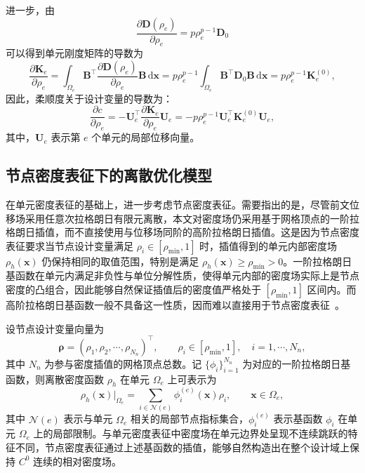 进一步，由
\[
\frac{\partial \boldsymbol D(\rho_e)}{\partial \rho_e} = p\rho_e^{p-1}\boldsymbol D_0
\]
可以得到单元刚度矩阵的导数为
\[
\frac{\partial\boldsymbol{K}_e}{\partial\rho_e} = \int_{\Omega_e}\boldsymbol{B}^{\top}\frac{\partial\boldsymbol{D}(\rho_e)}{\partial\rho_e}\boldsymbol{B}\,\mathrm{d}\boldsymbol{x} = p\rho_e^{p-1}\int_{\Omega_e}\boldsymbol{B}^{\top}\boldsymbol{D}_0\boldsymbol{B}\,\mathrm{d}\boldsymbol{x} = p\rho_e^{p-1}\boldsymbol{K}_e^{(0)},
\]
因此，柔顺度关于设计变量的导数为：
\begin{equation} \label{eq:ch3_sens_cell_compliance}
	\frac{\partial{c}}{\partial\rho_e} = -\boldsymbol{U}_e^{\top}\frac{\partial\boldsymbol{K}_e}{\partial\rho_e}\boldsymbol{U}_e = -p\rho_e^{p-1}\boldsymbol{U}_e^{\top}\boldsymbol{K}_e^{(0)}\boldsymbol{U}_e,
\end{equation}
其中，$\boldsymbol{U}_e$ 表示第 $e$ 个单元的局部位移向量。


\subsection{节点密度表征下的离散优化模型}
\label{subsec:node_density_rep}

在单元密度表征的基础上，进一步考虑节点密度表征。需要指出的是，尽管前文位移场采用任意次拉格朗日有限元离散，本文对密度场仍采用基于网格顶点的一阶拉格朗日插值，而不直接使用与位移场同阶的高阶拉格朗日插值。这是因为节点密度表征要求当节点设计变量满足 $\rho_i\in[\rho_{\min},1]$ 时，插值得到的单元内部密度场 $\rho_h(\boldsymbol{x})$ 仍保持相同的取值范围，特别是满足 $\rho_h(\boldsymbol{x})\ge \rho_{\min}>0$。一阶拉格朗日基函数在单元内满足非负性与单位分解性质，使得单元内部的密度场实际上是节点密度的凸组合，因此能够自然保证插值后的密度值严格处于 $[\rho_{\min}, 1]$ 区间内。而高阶拉格朗日基函数一般不具备这一性质，因而难以直接用于节点密度表征~\cite{kangNodalVariableMethod2012a}。

设节点设计变量向量为
\[
\boldsymbol{\rho}=(\rho_1,\rho_2,\cdots,\rho_{N_n})^{\top},\qquad \rho_i\in[\rho_{\min},1],\quad i=1,\cdots,N_n,
\]
其中 $N_n$ 为参与密度插值的网格顶点总数。记 $\{\phi_i\}_{i=1}^{N_n}$ 为对应的一阶拉格朗日基函数，则离散密度函数 $\rho_h$ 在单元 $\Omega_e$ 上可表示为
\[
\rho_h(\boldsymbol{x})\big|_{\Omega_e} = \sum_{i\in\mathcal N(e)}\phi_i^{(e)}(\boldsymbol{x})\rho_i, \qquad \boldsymbol{x}\in\Omega_e,
\]
其中 $\mathcal N(e)$ 表示与单元 $\Omega_e$ 相关的局部节点指标集合，$\phi_i^{(e)}$ 表示基函数 $\phi_i$ 在单元 $\Omega_e$ 上的局部限制。与单元密度表征中密度场在单元边界处呈现不连续跳跃的特征不同，节点密度表征通过上述基函数的插值，能够自然构造出在整个设计域上保持 $C^0$ 连续的相对密度场。

